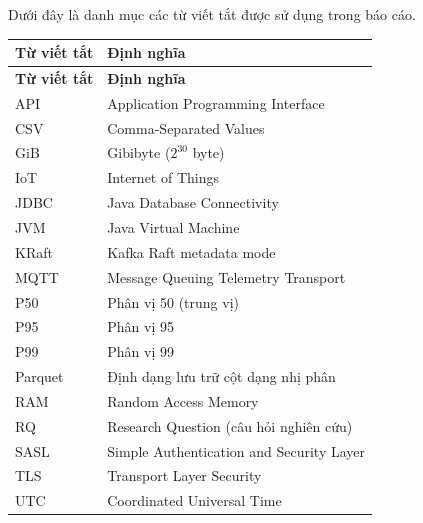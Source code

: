 \documentclass[a4paper,oneside,12pt]{book}
\begin{document}
\cleardoublepage
\pagestyle{fancy}



\clearpage
\pagestyle{fancy}

\tableofcontents
\cleardoublepage
{}
\pagestyle{fancy}
\listoftables
\cleardoublepage

\listoffigures
\cleardoublepage

\pagestyle{fancy}

\begin{abbreviation}
Dưới đây là danh mục các từ viết tắt được sử dụng trong báo cáo.

\begin{longtable}{p{3cm} p{10.5cm}}
\hline
\textbf{Từ viết tắt} & \textbf{Định nghĩa} \\
\hline
\endfirsthead
\hline
\textbf{Từ viết tắt} & \textbf{Định nghĩa} \\
\hline
\endhead

API     & Application Programming Interface \\
CSV     & Comma-Separated Values \\
GiB     & Gibibyte ($2^{30}$ byte) \\
IoT     & Internet of Things \\
JDBC    & Java Database Connectivity \\
JVM     & Java Virtual Machine \\
KRaft   & Kafka Raft metadata mode \\
MQTT    & Message Queuing Telemetry Transport \\
P50     & Phân vị 50 (trung vị) \\
P95     & Phân vị 95 \\
P99     & Phân vị 99 \\
Parquet & Định dạng lưu trữ cột dạng nhị phân \\
RAM     & Random Access Memory \\
RQ      & Research Question (câu hỏi nghiên cứu) \\
SASL    & Simple Authentication and Security Layer \\
TLS     & Transport Layer Security \\
UTC     & Coordinated Universal Time \\
\hline
\end{longtable}
\end{abbreviation}
\end{document}
